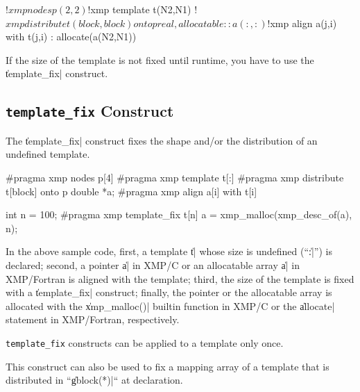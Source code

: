 \begin{XFexample}
!$xmp nodes p(2,2)
!$xmp template t(N2,N1)
!$xmp distribute t(block,block) onto p
real, allocatable :: a(:,:)
!$xmp align a(j,i) with t(j,i)
  :
allocate(a(N2,N1))
\end{XFexample}

\begin{mynote}
  If the size of the template is not fixed until runtime, you have to
  use the \|template_fix| construct.
\end{mynote}


\subsection{{\tt template\_fix} Construct}
\label{184243_1Nov19}

The \|template_fix| construct fixes the shape and/or the distribution of
an undefined template. 

\begin{XCexample}
#pragma xmp nodes p[4]
#pragma xmp template t[:]
#pragma xmp distribute t[block] onto p
double *a;
#pragma xmp align a[i] with t[i]

int n = 100;
#pragma xmp template_fix t[n]
a = xmp_malloc(xmp_desc_of(a), n);
\end{XCexample}


In the above sample code, 
%
first, a template \|t| whose size is undefined (``\|:|'') is declared;
%
second, a pointer \|a| in XMP/C or an allocatable array \|a| in
XMP/Fortran is aligned with the template;
%
third, the size of the template is fixed with a \|template_fix|
construct;
%
finally, the pointer or the allocatable array is allocated with the
\|xmp_malloc()| builtin function in XMP/C or the \|allocate| statement
in XMP/Fortran, respectively.

\begin{mynote}
{\tt template\_fix} constructs can be applied to a template only once.
\end{mynote}

This construct can also be used to fix a mapping array of a template
that is distributed in ``\|gblock(*)|`` at declaration.

